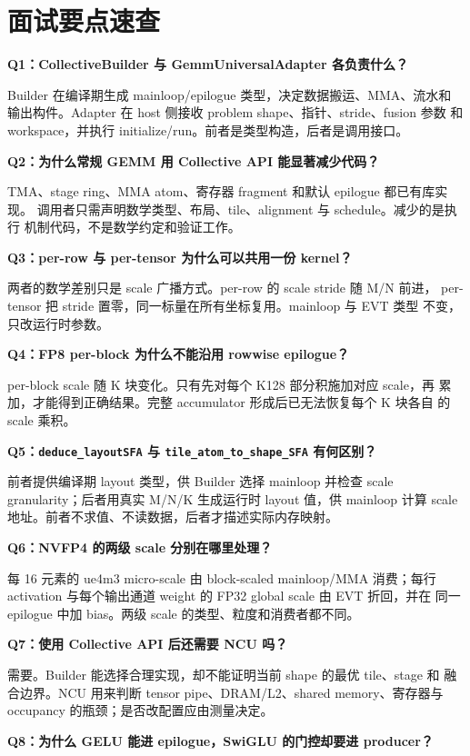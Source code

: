 \section{面试要点速查}

\textbf{Q1：CollectiveBuilder 与 GemmUniversalAdapter 各负责什么？}

Builder 在编译期生成 mainloop/epilogue 类型，决定数据搬运、MMA、流水和
输出构件。Adapter 在 host 侧接收 problem shape、指针、stride、fusion 参数
和 workspace，并执行 initialize/run。前者是类型构造，后者是调用接口。

\textbf{Q2：为什么常规 GEMM 用 Collective API 能显著减少代码？}

TMA、stage ring、MMA atom、寄存器 fragment 和默认 epilogue 都已有库实现。
调用者只需声明数学类型、布局、tile、alignment 与 schedule。减少的是执行
机制代码，不是数学约定和验证工作。

\textbf{Q3：per-row 与 per-tensor 为什么可以共用一份 kernel？}

两者的数学差别只是 scale 广播方式。per-row 的 scale stride 随 M/N 前进，
per-tensor 把 stride 置零，同一标量在所有坐标复用。mainloop 与 EVT 类型
不变，只改运行时参数。

\textbf{Q4：FP8 per-block 为什么不能沿用 rowwise epilogue？}

per-block scale 随 K 块变化。只有先对每个 K128 部分积施加对应 scale，再
累加，才能得到正确结果。完整 accumulator 形成后已无法恢复每个 K 块各自
的 scale 乘积。

\textbf{Q5：\texttt{deduce\_layoutSFA} 与
\texttt{tile\_atom\_to\_shape\_SFA} 有何区别？}

前者提供编译期 layout 类型，供 Builder 选择 mainloop 并检查 scale
granularity；后者用真实 M/N/K 生成运行时 layout 值，供 mainloop 计算
scale 地址。前者不求值、不读数据，后者才描述实际内存映射。

\textbf{Q6：NVFP4 的两级 scale 分别在哪里处理？}

每 16 元素的 ue4m3 micro-scale 由 block-scaled mainloop/MMA 消费；每行
activation 与每个输出通道 weight 的 FP32 global scale 由 EVT 折回，并在
同一 epilogue 中加 bias。两级 scale 的类型、粒度和消费者都不同。

\textbf{Q7：使用 Collective API 后还需要 NCU 吗？}

需要。Builder 能选择合理实现，却不能证明当前 shape 的最优 tile、stage 和
融合边界。NCU 用来判断 tensor pipe、DRAM/L2、shared memory、寄存器与
occupancy 的瓶颈；是否改配置应由测量决定。

\textbf{Q8：为什么 GELU 能进 epilogue，SwiGLU 的门控却要进 producer？}

